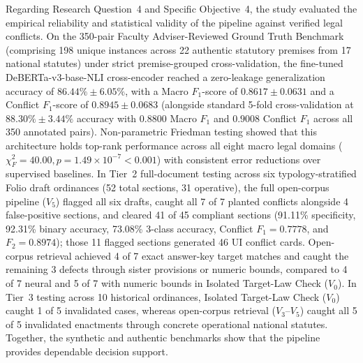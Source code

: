 Regarding Research Question~4 and Specific Objective~4, the study evaluated the empirical reliability and statistical validity of the pipeline against verified legal conflicts. On the 350-pair Faculty Adviser-Reviewed Ground Truth Benchmark (comprising 198 unique instances across 22 authentic statutory premises from 17 national statutes) under strict premise-grouped cross-validation, the fine-tuned DeBERTa-v3-base-NLI cross-encoder reached a zero-leakage generalization accuracy of $86.44\% \pm 6.05\%$, with a Macro $F_1$-score of $0.8617 \pm 0.0631$ and a Conflict $F_1$-score of $0.8945 \pm 0.0683$ (alongside standard 5-fold cross-validation at $88.30\% \pm 3.44\%$ accuracy with $0.8800$ Macro $F_1$ and $0.9008$ Conflict $F_1$ across all 350 annotated pairs). Non-parametric Friedman testing showed that this architecture holds top-rank performance across all eight macro legal domains ($\chi_F^2 = 40.00, p = 1.49 \times 10^{-7} < 0.001$) with consistent error reductions over supervised baselines. In Tier~2 full-document testing across six typology-stratified Folio draft ordinances (52 total sections, 31 operative), the full open-corpus pipeline ($V_5$) flagged all six drafts, caught all 7 of 7 planted conflicts alongside 4 false-positive sections, and cleared 41 of 45 compliant sections (91.11\% specificity, 92.31\% binary accuracy, 73.08\% 3-class accuracy, Conflict $F_1 = 0.7778$, and $F_2 = 0.8974$); those 11 flagged sections generated 46 UI conflict cards. Open-corpus retrieval achieved 4 of 7 exact answer-key target matches and caught the remaining 3 defects through sister provisions or numeric bounds, compared to 4 of 7 neural and 5 of 7 with numeric bounds in Isolated Target-Law Check ($V_0$). In Tier~3 testing across 10 historical ordinances, Isolated Target-Law Check ($V_0$) caught 1 of 5 invalidated cases, whereas open-corpus retrieval ($V_3$--$V_5$) caught all 5 of 5 invalidated enactments through concrete operational national statutes. Together, the synthetic and authentic benchmarks show that the pipeline provides dependable decision support.


